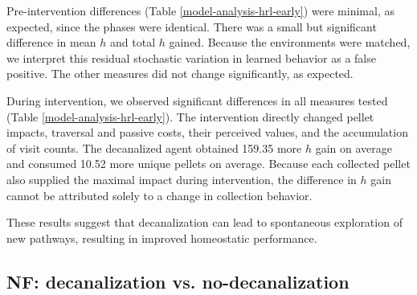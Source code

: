 \documentclass[12pt,fleqn]{article}
\begin{document}
Pre-intervention differences (Table \ref{model-analysis-hrl-early}) were minimal, as expected, since the phases were identical. There was a small but significant difference in mean \(h\) and total \(h\) gained. Because the environments were matched, we interpret this residual stochastic variation in learned behavior as a false positive. The other measures did not change significantly, as expected.

During intervention, we observed significant differences in all measures tested (Table \ref{model-analysis-hrl-early}). The intervention directly changed pellet impacts, traversal and passive costs, their perceived values, and the accumulation of visit counts. The decanalized agent obtained 159.35 more \(h\) gain on average and consumed 10.52 more unique pellets on average. Because each collected pellet also supplied the maximal impact during intervention, the difference in \(h\) gain cannot be attributed solely to a change in collection behavior.

These results suggest that decanalization can lead to spontaneous exploration of new pathways, resulting in improved homeostatic performance.

\subsection{NF: decanalization vs. no-decanalization}
\end{document}
